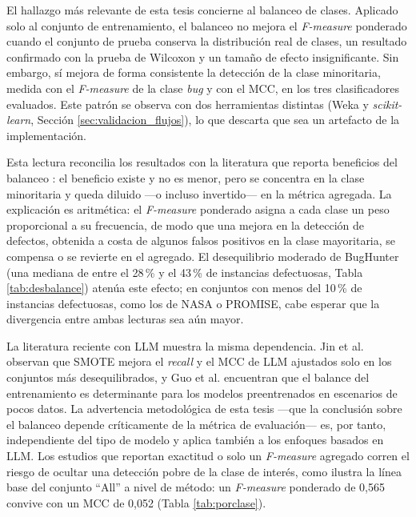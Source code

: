 El hallazgo más relevante de esta tesis concierne al balanceo de clases. Aplicado solo al conjunto de entrenamiento, el balanceo no mejora el \textit{F-measure} ponderado cuando el conjunto de prueba conserva la distribución real de clases, un resultado confirmado con la prueba de Wilcoxon y un tamaño de efecto insignificante. Sin embargo, sí mejora de forma consistente la detección de la clase minoritaria, medida con el \textit{F-measure} de la clase \textit{bug} y con el MCC, en los tres clasificadores evaluados. Este patrón se observa con dos herramientas distintas (Weka y \textit{scikit-learn}, Sección \ref{sec:validacion_flujos}), lo que descarta que sea un artefacto de la implementación.

Esta lectura reconcilia los resultados con la literatura que reporta beneficios del balanceo \cite{8494821,rathi_empirical_2023}: el beneficio existe y no es menor, pero se concentra en la clase minoritaria y queda diluido ---o incluso invertido--- en la métrica agregada. La explicación es aritmética: el \textit{F-measure} ponderado asigna a cada clase un peso proporcional a su frecuencia, de modo que una mejora en la detección de defectos, obtenida a costa de algunos falsos positivos en la clase mayoritaria, se compensa o se revierte en el agregado. El desequilibrio moderado de BugHunter (una mediana de entre el 28\,\% y el 43\,\% de instancias defectuosas, Tabla \ref{tab:desbalance}) atenúa este efecto; en conjuntos con menos del 10\,\% de instancias defectuosas, como los de NASA o PROMISE, cabe esperar que la divergencia entre ambas lecturas sea aún mayor.

La literatura reciente con LLM muestra la misma dependencia. Jin et al. \cite{jin2025llm4sdp} observan que SMOTE mejora el \textit{recall} y el MCC de LLM ajustados solo en los conjuntos más desequilibrados, y Guo et al. \cite{guo2023} encuentran que el balance del entrenamiento es determinante para los modelos preentrenados en escenarios de pocos datos. La advertencia metodológica de esta tesis ---que la conclusión sobre el balanceo depende críticamente de la métrica de evaluación--- es, por tanto, independiente del tipo de modelo y aplica también a los enfoques basados en LLM. Los estudios que reportan exactitud \cite{khokhar2025finetuned} o solo un \textit{F-measure} agregado corren el riesgo de ocultar una detección pobre de la clase de interés, como ilustra la línea base del conjunto ``All'' a nivel de método: un \textit{F-measure} ponderado de 0,565 convive con un MCC de 0,052 (Tabla \ref{tab:porclase}).

